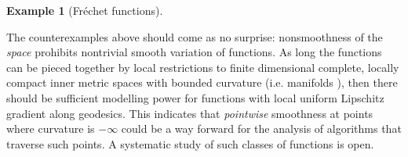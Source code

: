 \documentclass{article}
\theoremstyle{plain}\newtheorem{theorem}{Theorem}[section]
\theoremstyle{plain}\newtheorem{definition}[theorem]{Definition}
\theoremstyle{plain}\newtheorem{lemma}[theorem]{Lemma}
\theoremstyle{definition}\newtheorem{remark}[theorem]{Remark}
\theoremstyle{definition}\newtheorem{example}[theorem]{Example}
\theoremstyle{plain}\newtheorem{proposition}[theorem]{Proposition}
\theoremstyle{plain}\newtheorem{inference}[theorem]{Inference}
\theoremstyle{plain}\newtheorem{corollary}[theorem]{Corollary}
\theoremstyle{plain}\newtheorem{assumption}[theorem]{Assumption}
\begin{document}
\begin{example}[Fr\'echet functions]
\end{example}
The counterexamples above should come as no surprise:  nonsmoothness of the
{\em space} prohibits nontrivial smooth variation of functions.  As long
the functions can be pieced together by local restrictions to finite dimensional
complete, locally compact inner metric spaces with bounded curvature (i.e. manifolds \cite[Theorem A]{Plaut92}),
then there should be sufficient modelling power for functions with local uniform Lipschitz gradient along geodesics. 
This indicates that {\em pointwise} smoothness at points where curvature is $-\infty$ could be a way forward 
for the analysis of algorithms that traverse such points.  
A systematic study
of such classes of functions is open.  
\end{document}
